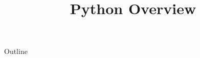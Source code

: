 \documentclass[xcolor=dvipsnames,compress,t,pdf,9pt]{beamer}
\title[\insertframenumber /\inserttotalframenumber]{Python Overview}
\begin{document}
	\begin{frame}
	\titlepage
	\end{frame}

	\begin{frame}{Outline}
	    \tableofcontents
	\end{frame}

	
	
	
\end{document}
